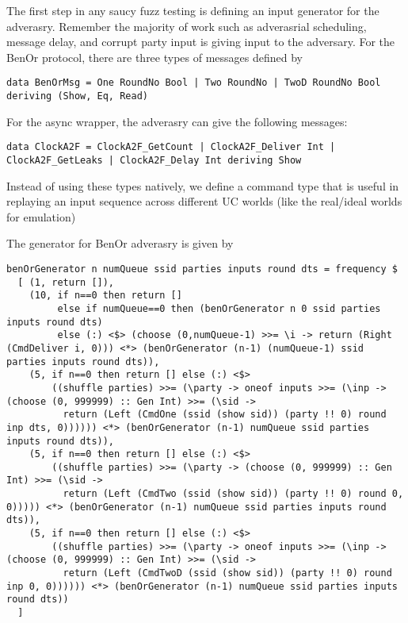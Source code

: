 The first step in any saucy fuzz testing is defining an input generator for the adverasry. 
Remember the majority of work such as adverasrial scheduling, message delay, and corrupt party input \Z is giving input to the adversary. 	
For the BenOr protocol, there are three types of messages defined by
\begin{lstlisting}
data BenOrMsg = One RoundNo Bool | Two RoundNo | TwoD RoundNo Bool deriving (Show, Eq, Read)
\end{lstlisting}
For the async wrapper, the adverasry can give the following messages:
\begin{lstlisting}
data ClockA2F = ClockA2F_GetCount | ClockA2F_Deliver Int | ClockA2F_GetLeaks | ClockA2F_Delay Int deriving Show
\end{lstlisting}
Instead of using these types natively, we define a command type that is useful in replaying an input sequence across different UC worlds (like the real/ideal worlds for emulation)

The generator for BenOr adverasry is given by
\begin{lstlisting}
benOrGenerator n numQueue ssid parties inputs round dts = frequency $
  [ (1, return []), 
    (10, if n==0 then return []
         else if numQueue==0 then (benOrGenerator n 0 ssid parties inputs round dts)
         else (:) <$> (choose (0,numQueue-1) >>= \i -> return (Right (CmdDeliver i, 0))) <*> (benOrGenerator (n-1) (numQueue-1) ssid parties inputs round dts)),
    (5, if n==0 then return [] else (:) <$> 
        ((shuffle parties) >>= (\party -> oneof inputs >>= (\inp -> (choose (0, 999999) :: Gen Int) >>= (\sid -> 
          return (Left (CmdOne (ssid (show sid)) (party !! 0) round inp dts, 0)))))) <*> (benOrGenerator (n-1) numQueue ssid parties inputs round dts)),
    (5, if n==0 then return [] else (:) <$>
        ((shuffle parties) >>= (\party -> (choose (0, 999999) :: Gen Int) >>= (\sid -> 
          return (Left (CmdTwo (ssid (show sid)) (party !! 0) round 0, 0))))) <*> (benOrGenerator (n-1) numQueue ssid parties inputs round dts)),
    (5, if n==0 then return [] else (:) <$>
        ((shuffle parties) >>= (\party -> oneof inputs >>= (\inp -> (choose (0, 999999) :: Gen Int) >>= (\sid -> 
          return (Left (CmdTwoD (ssid (show sid)) (party !! 0) round inp 0, 0)))))) <*> (benOrGenerator (n-1) numQueue ssid parties inputs round dts)) 
  ]
\end{lstlisting}

